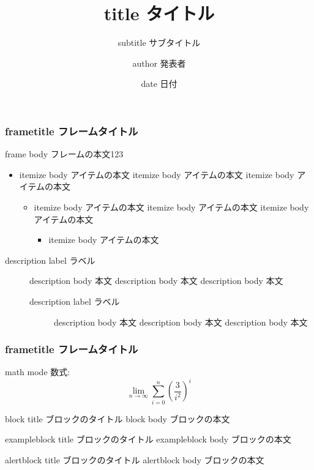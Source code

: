 \documentclass[dvipdfmx,14pt,hyperref={hidelinks},t]{beamer}
\title{title タイトル}
\author{author 発表者}
\institute{institute 所属}
\subtitle{subtitle サブタイトル}
\date{date 日付}
\begin{document}
\begin{frame}[plain]
  \titlepage
\end{frame}

\begin{frame}
  \frametitle{frametitle フレームタイトル}
  frame body フレームの本文123
  \begin{itemize}
  \item itemize body アイテムの本文 itemize body アイテムの本文 itemize body アイテムの本文
    \begin{itemize}
    \item itemize body アイテムの本文 itemize body アイテムの本文 itemize body アイテムの本文
      \begin{itemize}
      \item  itemize body アイテムの本文
      \end{itemize}
    \end{itemize}
  \end{itemize}
  \begin{description}
  \item[description label ラベル] description body 本文 description body 本文 description body 本文
    \begin{description}
    \item[description label ラベル] description body 本文 description body 本文 description body 本文
    \end{description}
  \end{description}
\end{frame}

\begin{frame}[fragile]
  \frametitle{frametitle フレームタイトル}
  math mode 数式:
  \[
    \lim_{n\to\infty}\sum_{i=0}^{n} \left(\frac{3}{i^2}\right)^i
  \]
  \begin{block}{block title ブロックのタイトル}
    block body ブロックの本文
  \end{block}
  \begin{exampleblock}{exampleblock title ブロックのタイトル}
    exampleblock body ブロックの本文
  \end{exampleblock}
  \begin{alertblock}{alertblock title ブロックのタイトル}
    alertblock body ブロックの本文
  \end{alertblock}
\end{frame}
\end{document}
